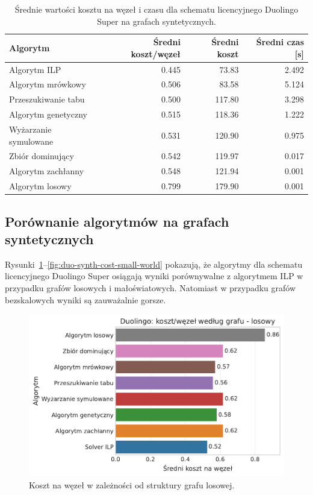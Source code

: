 \begin{table}[H]
  \centering
  \caption{Średnie wartości kosztu na węzeł i czasu dla schematu licencyjnego Duolingo Super na grafach syntetycznych.}
  \label{tab:duo-synth-summary}
  \begin{tabular}{lrrr}
    \toprule
    \textbf{Algorytm}     & \textbf{Średni koszt/węzeł} & \textbf{Średni koszt} & \textbf{Średni czas [s]} \\
    \midrule
    Algorytm ILP          & 0.445                       & 73.83                 & 2.492                    \\
    Algorytm mrówkowy     & 0.506                       & 83.58                 & 5.124                    \\
    Przeszukiwanie tabu   & 0.500                       & 117.80                & 3.298                    \\
    Algorytm genetyczny   & 0.515                       & 118.36                & 1.222                    \\
    Wyżarzanie symulowane & 0.531                       & 120.90                & 0.975                    \\
    Zbiór dominujący      & 0.542                       & 119.97                & 0.017                    \\
    Algorytm zachłanny    & 0.548                       & 121.94                & 0.001                    \\
    Algorytm losowy       & 0.799                       & 179.90                & 0.001                    \\
    \bottomrule
  \end{tabular}
\end{table}


\subsection{Porównanie algorytmów na grafach syntetycznych}

Rysunki~\ref{fig:duo-synth-cost-random}--\ref{fig:duo-synth-cost-small-world} pokazują, że algorytmy dla schematu licencyjnego Duolingo Super osiągają wyniki porównywalne z algorytmem ILP w przypadku grafów losowych i małoświatowych. Natomiast w przypadku grafów bezskalowych wyniki są zauważalnie gorsze.


\begin{figure}[H]
  \centering
  \includegraphics[width=0.65\linewidth]{assets/figures/benchmark/synthetic/duolingo_cost_per_node_by_graph_random.pdf}
  \caption{Koszt na węzeł w zależności od struktury grafu losowej.}
  \label{fig:duo-synth-cost-random}
\end{figure}

